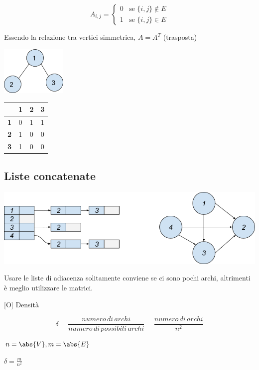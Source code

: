 \documentclass[tikz]{article}
\begin{document}
\begin{equation}
A_{i,j} = 
\begin{cases}
0 & \mbox{se } \{i,j\} \notin E \\ 
1 & \mbox{se } \{i,j\} \in E
\end{cases}
\end{equation}

{Essendo la relazione tra vertici simmetrica, $A=A^T$ (trasposta)}

{\includegraphics{images/image535.png}}

\begin{tabular}{|c|c|c|c|}
\hline 
  & \textbf{1} & \textbf{2} & \textbf{3} \\ 
\hline 
\textbf{1} & 0 & 1 & 1 \\ 
\hline 
\textbf{2} & 1 & 0 & 0 \\ 
\hline 
\textbf{3} & 1 & 0 & 0 \\ 
\hline 
\end{tabular} 

\subsection{Liste concatenate}

{\includegraphics{images/image537.png}}

{Usare le liste di adiacenza solitamente conviene se ci sono pochi archi, altrimenti è meglio utilizzare le matrici.}

{{[}O{]} Densità}

\begin{equation}
\delta=\frac{numero\,di\,archi}{numero\,di\,possibili\,archi} = \frac{numero\,di\,archi}{n^2}
\end{equation}

$n=\abs{V},m=\abs{E}$

$\delta=\frac{m}{n^2}$
\end{document}
